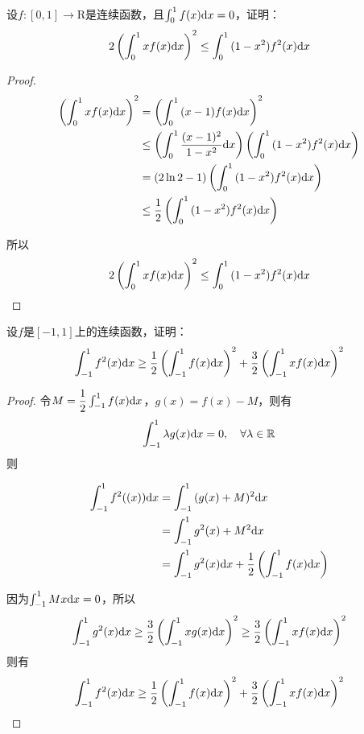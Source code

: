 \begin{proposition}

    设$f:[0,1]\to \mathrm{R}$是连续函数，且$\int_{0}^{1}{f(x)}\mathrm{d} x = 0$，证明：
    $$2 \left(\int_{0}^{1}{xf(x)}\mathrm{d} x \right)^2 \leq \int_{0}^{1}{(1 - x^2)f^2(x)}\mathrm{d} x$$

\end{proposition}

\begin{proof}

    \begin{align*}
        \left(\int_{0}^{1}{xf(x)}\mathrm{d} x \right)^2 & = \left( \int_{0}^{1}{(x-1)f(x)}\mathrm{d} x \right)^2 \\
        & \leq \left( \int_{0}^{1}{\dfrac{(x-1)^2}{1 - x^2}}\mathrm{d} x \right) \left( \int_{0}^{1}{(1 - x^2)f^2(x)}\mathrm{d} x \right) \\
        & = (2\ln{2} - 1)  \left( \int_{0}^{1}{(1 - x^2)f^2(x)}\mathrm{d} x \right) \\
        & \leq \dfrac{1}{2} \left( \int_{0}^{1}{(1 - x^2)f^2(x)}\mathrm{d} x \right)
    \end{align*}

    所以
    $$2 \left(\int_{0}^{1}{xf(x)}\mathrm{d} x \right)^2 \leq \int_{0}^{1}{(1 - x^2)f^2(x)}\mathrm{d} x$$

\end{proof}

\begin{proposition}

    设$f$是$[-1,1]$上的连续函数，证明：
    $$\int_{-1}^{1}{f^2(x)}\mathrm{d} x \geq \dfrac{1}{2} \left( \int_{-1}^{1}{f(x)}\mathrm{d} x \right)^2 + \dfrac{3}{2} \left( \int_{-1}^{1}{xf(x)}\mathrm{d} x \right)^2$$

\end{proposition}

\begin{proof}

    令$M = \dfrac{1}{2} \int_{-1}^{1}{f(x)}\mathrm{d} x$，$g(x) = f(x) - M$，则有
    $$\int_{-1}^{1}{\lambda g(x)}\mathrm{d} x = 0, \quad \forall \lambda \in \mathbb{R}$$
    则

    \begin{align*}
        \int_{-1}^{1}{f^2((x))}\mathrm{d} x & = \int_{-1}^{1}{(g(x) + M)^2}\mathrm{d} x \\
        & = \int_{-1}^{1}{g^2(x) + M^2}\mathrm{d} x \\
        & = \int_{-1}^{1}{g^2(x)}\mathrm{d} x + \dfrac{1}{2} \left( \int_{-1}^{1}{f(x)}\mathrm{d} x \right)
    \end{align*}

    因为$\int_{-1}^{1}{Mx}\mathrm{d} x = 0$，所以
    $$\int_{-1}^{1}{g^2(x)}\mathrm{d} x \geq \dfrac{3}{2} \left( \int_{-1}^{1}{xg(x)}\mathrm{d} x \right)^2 \geq \dfrac{3}{2} \left( \int_{-1}^{1}{xf(x)}\mathrm{d} x \right)^2$$
    则有
    $$\int_{-1}^{1}{f^2(x)}\mathrm{d} x \geq \dfrac{1}{2} \left( \int_{-1}^{1}{f(x)}\mathrm{d} x \right)^2 + \dfrac{3}{2} \left( \int_{-1}^{1}{xf(x)}\mathrm{d} x \right)^2$$

\end{proof} 

